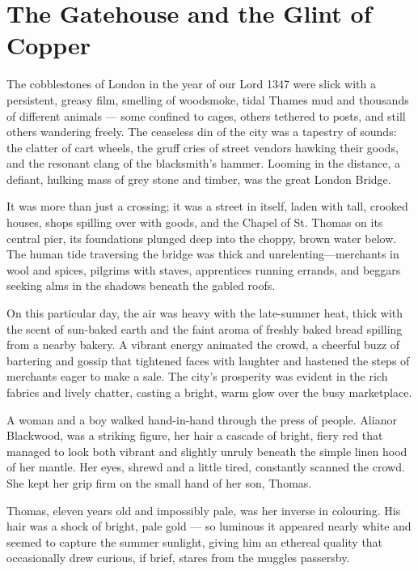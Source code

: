 
\chapter{The Gatehouse and the Glint of Copper}

The cobblestones of London in the year of our Lord 1347 were slick with a persistent, greasy film, smelling of woodsmoke, tidal Thames mud and thousands of different animals --- some confined to cages, others tethered to posts, and still others wandering freely. The ceaseless din of the city was a tapestry of sounds: the clatter of cart wheels, the gruff cries of street vendors hawking their goods, and the resonant clang of the blacksmith's hammer. Looming in the distance, a defiant, hulking mass of grey stone and timber, was the great London Bridge.

It was more than just a crossing; it was a street in itself, laden with tall, crooked houses, shops spilling over with goods, and the Chapel of St. Thomas on its central pier, its foundations plunged deep into the choppy, brown water below. The human tide traversing the bridge was thick and unrelenting---merchants in wool and spices, pilgrims with staves, apprentices running errands, and beggars seeking alms in the shadows beneath the gabled roofs.

On this particular day, the air was heavy with the late-summer heat, thick with the scent of sun-baked earth and the faint aroma of freshly baked bread spilling from a nearby bakery. A vibrant energy animated the crowd, a cheerful buzz of bartering and gossip that tightened faces with laughter and hastened the steps of merchants eager to make a sale. The city's prosperity was evident in the rich fabrics and lively chatter, casting a bright, warm glow over the busy marketplace.

A woman and a boy walked hand-in-hand through the press of people. Alianor Blackwood, was a striking figure, her hair a cascade of bright, fiery red that managed to look both vibrant and slightly unruly beneath the simple linen hood of her mantle. Her eyes, shrewd and a little tired, constantly scanned the crowd. She kept her grip firm on the small hand of her son, Thomas.

Thomas, eleven years old and impossibly pale, was her inverse in colouring. His hair was a shock of bright, pale gold --- so luminous it appeared nearly white and seemed to capture the summer sunlight, giving him an ethereal quality that occasionally drew curious, if brief, stares from the muggles passersby.


